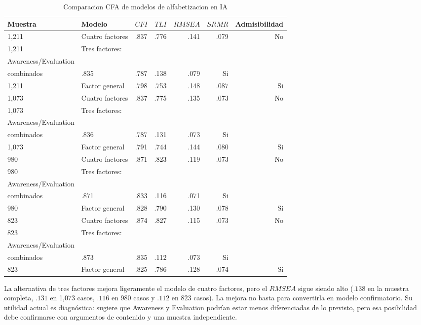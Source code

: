 \documentclass[11pt,a4paper]{article}
\begin{document}
\begin{table}[ht]
\centering
\caption{Comparacion CFA de modelos de alfabetizacion en IA}
\begin{tabular}{llrrrrr}
\toprule
Muestra & Modelo & $CFI$ & $TLI$ & $RMSEA$ & $SRMR$ & Admisibilidad \\
\midrule
1,211 & Cuatro factores & .837 & .776 & .141 & .079 & No \\
1,211 & Tres factores: \\ Awareness/Evaluation \\ combinados & .835 & .787 & .138 & .079 & Si \\
1,211 & Factor general & .798 & .753 & .148 & .087 & Si \\
1,073 & Cuatro factores & .837 & .775 & .135 & .073 & No \\
1,073 & Tres factores: \\ Awareness/Evaluation \\ combinados & .836 & .787 & .131 & .073 & Si \\
1,073 & Factor general & .791 & .744 & .144 & .080 & Si \\
980 & Cuatro factores & .871 & .823 & .119 & .073 & No \\
980 & Tres factores: \\ Awareness/Evaluation \\ combinados & .871 & .833 & .116 & .071 & Si \\
980 & Factor general & .828 & .790 & .130 & .078 & Si \\
823 & Cuatro factores & .874 & .827 & .115 & .073 & No \\
823 & Tres factores: \\ Awareness/Evaluation \\ combinados & .873 & .835 & .112 & .073 & Si \\
823 & Factor general & .825 & .786 & .128 & .074 & Si \\
\bottomrule
\end{tabular}
\end{table}

La alternativa de tres factores mejora ligeramente el modelo de cuatro factores, pero el $RMSEA$ sigue siendo alto ($.138$ en la muestra completa, $.131$ en 1,073 casos, $.116$ en 980 casos y $.112$ en 823 casos). La mejora no basta para convertirla en modelo confirmatorio. Su utilidad actual es diagnóstica: sugiere que Awareness y Evaluation podrían estar menos diferenciadas de lo previsto, pero esa posibilidad debe confirmarse con argumentos de contenido y una muestra independiente.
\end{document}
